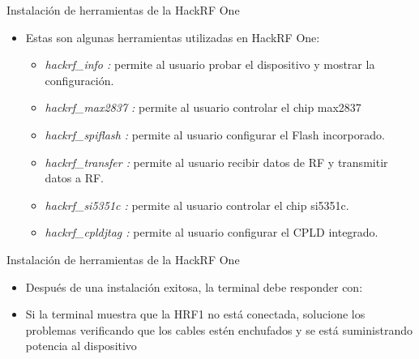 \begin{frame}{Instalación de  herramientas de la HackRF One}

\begin{itemize}
    \item
    {Estas son algunas herramientas utilizadas en HackRF One:
    \begin{itemize}
        \item  {\textit{hackrf\_info :} permite al usuario probar el dispositivo y mostrar la configuración.}
        \item  {\textit{hackrf\_max2837 :} permite al usuario controlar el chip max2837}
        \item  {\textit{hackrf\_spiflash :} permite al usuario configurar el Flash incorporado.}
        \item  {\textit{hackrf\_transfer :} permite al usuario recibir datos de RF y transmitir datos a RF.}
        \item  {\textit{hackrf\_si5351c :} permite al usuario controlar el chip si5351c.}
        \item  {\textit{hackrf\_cpldjtag :} permite al usuario configurar el CPLD integrado.}
    \end{itemize}
    }
\end{itemize}
\end{frame}

\begin{frame}{Instalación de  herramientas de la HackRF One}

\begin{itemize}
    \item
    {Después de una instalación exitosa, la terminal debe responder con: \hspace{1pt} }
    \item
    {Si la terminal muestra que la HRF1 no está conectada, solucione los problemas verificando que los cables estén enchufados y se está suministrando potencia al dispositivo}
    
\end{itemize}
\end{frame}

